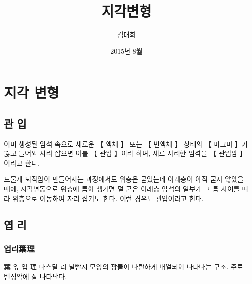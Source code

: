 \documentclass[12pt, a4paper, oneside]{book}
\begin{document}
	
			\dominitoc
			

			\title{지각변형}
			\author{김대희}
			\date{2015년 8월}
			\maketitle


			\tableofcontents
			\listoffigures
			\listoftables

			

	\newpage
	\chapter{지각 변형}


		\newpage
		\minitoc				%


	\newpage  \null
	\section{관 입}




이미 생성된 암석 속으로 새로운 【 액체 】 또는 【 반액체 】 상태의 【 마그마 】가 뚫고 들어와 자리 잡으면 이를 【 관입 】이라 하며, 새로 자리한 암석을 【 관입암 】이라고 한다.


드물게 퇴적암이 만들어지는 과정에서도 위층은 굳었는데 아래층이 아직 굳지 않았을 때에, 지각변동으로 위층에 틈이 생기면 덜 굳은 아래층 암석의 일부가 그 틈 사이를 따라 위층으로 이동하여 자리 잡기도 한다. 이런 경우도 관입이라고 한다.




	\newpage  \null
	\section{엽 리}




	\subsection{엽리葉理}
葉 잎 엽  理 다스릴 리
널빤지 모양의 광물이 나란하게 배열되어 나타나는 구조. 
주로 변성암에 잘 나타난다.
\end{document}
